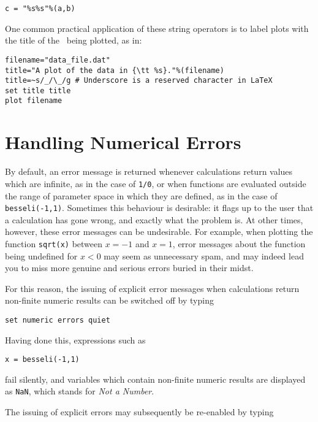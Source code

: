 \begin{verbatim}
c = "%s%s"%(a,b)
\end{verbatim}

One common practical application of these string operators is to label plots
with the title of the \datafile\ being plotted, as in:

\begin{verbatim}
filename="data_file.dat"
title="A plot of the data in {\tt %s}."%(filename)
title=~s/_/\_/g # Underscore is a reserved character in LaTeX
set title title
plot filename
\end{verbatim}

\section{Handling Numerical Errors}
\label{sec:num_errs}

By default, an error message is returned whenever calculations return values
which are infinite, as in the case of {\tt 1/0}, or when functions are
evaluated outside the range of parameter space in which they are defined, as in
the case of {\tt besseli(-1,1)}.  Sometimes this behaviour is desirable: it
flags up to the user that a calculation has gone wrong, and exactly what the
problem is.  At other times, however, these error messages can be undesirable.
For example, when plotting the function {\tt sqrt(x)} between $x=-1$ and $x=1$,
error messages about the function being undefined for $x<0$ may seem as
unnecessary spam, and may indeed lead you to miss more genuine and serious
errors buried in their midst.

For this reason, the issuing of explicit error messages when calculations
return non-finite numeric results can be switched off by typing

\begin{verbatim}
set numeric errors quiet
\end{verbatim}

\noindent Having done this, expressions such as

\begin{verbatim}
x = besseli(-1,1)
\end{verbatim}

\noindent fail silently, and variables which contain non-finite numeric results
are displayed as {\tt NaN}, which stands for {\it Not a
Number}.

The issuing of explicit errors may subsequently be re-enabled by typing

